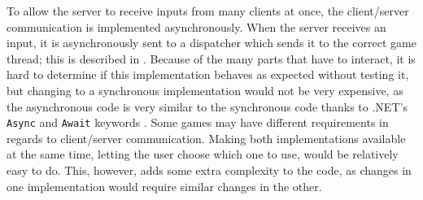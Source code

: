 To allow the server to receive inputs from many clients at once, the client/server communication is implemented asynchronously. When the server receives an input, it is asynchronously sent to a dispatcher which sends it to the correct game thread; this is described in . Because of the many parts that have to interact, it is hard to determine if this implementation behaves as expected without testing it, but changing to a synchronous implementation would not be very expensive, as the asynchronous code is very similar to the synchronous code thanks to .NET's \texttt{Async} and \texttt{Await} keywords \cite{ms-asyn}. Some games may have different requirements in regards to client/server communication. Making both implementations available at the same time, letting the user choose which one to use, would be relatively easy to do. This, however, adds some extra complexity to the code, as changes in one implementation would require similar changes in the other. 



%
%

